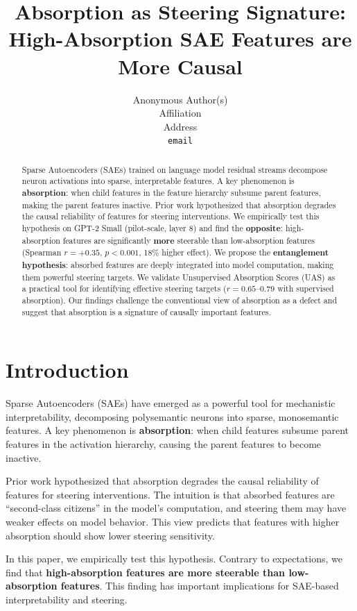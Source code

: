 \documentclass{article}
\title{Absorption as Steering Signature: High-Absorption SAE Features are More Causal}
\author{%
  Anonymous Author(s) \\
  Affiliation \\
  Address \\
  \texttt{email}
}
\begin{document}
\maketitle


\begin{abstract}
Sparse Autoencoders (SAEs) trained on language model residual streams decompose neuron activations into sparse, interpretable features. A key phenomenon is \textbf{absorption}: when child features in the feature hierarchy subsume parent features, making the parent features inactive. Prior work hypothesized that absorption degrades the causal reliability of features for steering interventions. We empirically test this hypothesis on GPT-2 Small (pilot-scale, layer 8) and find the \textbf{opposite}: high-absorption features are significantly \textbf{more} steerable than low-absorption features (Spearman $r=+0.35$, $p<0.001$, 18\% higher effect). We propose the \textbf{entanglement hypothesis}: absorbed features are deeply integrated into model computation, making them powerful steering targets. We validate Unsupervised Absorption Scores (UAS) as a practical tool for identifying effective steering targets ($r=0.65\text{--}0.79$ with supervised absorption). Our findings challenge the conventional view of absorption as a defect and suggest that absorption is a signature of causally important features.
\end{abstract}


\section{Introduction}

Sparse Autoencoders (SAEs) have emerged as a powerful tool for mechanistic interpretability, decomposing polysemantic neurons into sparse, monosemantic features. A key phenomenon is \textbf{absorption}: when child features subsume parent features in the activation hierarchy, causing the parent features to become inactive.

Prior work \citep{anthropic2023towards} hypothesized that absorption degrades the causal reliability of features for steering interventions. The intuition is that absorbed features are ``second-class citizens'' in the model's computation, and steering them may have weaker effects on model behavior. This view predicts that features with higher absorption should show lower steering sensitivity.

In this paper, we empirically test this hypothesis. Contrary to expectations, we find that \textbf{high-absorption features are more steerable than low-absorption features}. This finding has important implications for SAE-based interpretability and steering.
\end{document}
